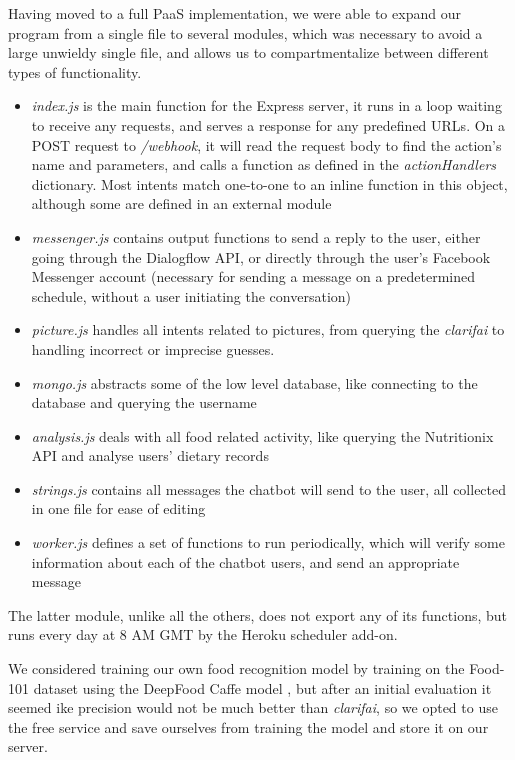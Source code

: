 Having moved to a full PaaS implementation, we were able to expand our program from a single file to several modules, which was necessary to avoid a large unwieldy single file, and allows us to compartmentalize between different types of functionality.
\begin{itemize}
  \item \textit{index.js} is the main function for the Express server, it runs in a loop waiting to receive any requests, and serves a response for any predefined URLs. On a POST request to \textit{/webhook}, it will read the request body to find the action's name and parameters, and calls a function as defined in the \textit{actionHandlers} dictionary. Most intents match one-to-one to an inline function in this object, although some are defined in an external module
  \item \textit{messenger.js} contains output functions to send a reply to the user, either going through the Dialogflow API, or directly through the user's Facebook Messenger account (necessary for sending a message on a predetermined schedule, without a user initiating the conversation)
  \item \textit{picture.js} handles all intents related to pictures, from querying the \textit{clarifai} to handling incorrect or imprecise guesses.
  \item \textit{mongo.js} abstracts some of the low level database, like connecting to the database and querying the username
  \item \textit{analysis.js} deals with all food related activity, like querying the Nutritionix API and analyse users' dietary records
  \item \textit{strings.js} contains all messages the chatbot will send to the user, all collected in one file for ease of editing
  \item \textit{worker.js} defines a set of functions to run periodically, which will verify some information about each of the chatbot users, and send an appropriate message
\end{itemize}
The latter module, unlike all the others, does not export any of its functions, but runs every day at 8 AM GMT by the Heroku scheduler add-on.

We considered training our own food recognition model by training on the Food-101 dataset using the DeepFood Caffe model \cite{liu2016deepfood}, but after an initial evaluation it seemed ike precision would not be much better than \textit{clarifai}, so we opted to use the free service and save ourselves from training the model and store it on our server.

